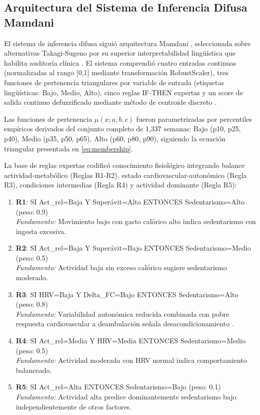 \subsection{Arquitectura del Sistema de Inferencia Difusa Mamdani}
\label{subsec:sistema_difuso}

El sistema de inferencia difusa siguió arquitectura Mamdani \cite{Mamdani1974}, seleccionada sobre alternativas Takagi-Sugeno por su superior interpretabilidad lingüística que habilita auditoría clínica \cite{Czmil2023FuzzyClassifiers}. El sistema comprendió cuatro entradas continuas (normalizadas al rango [0,1] mediante transformación RobustScaler), tres funciones de pertenencia triangulares por variable de entrada (etiquetas lingüísticas: Bajo, Medio, Alto), cinco reglas IF-THEN expertas y un score de salida continuo defuzzificado mediante método de centroide discreto \cite{Ross2010}.

Las funciones de pertenencia $\mu(x; a, b, c)$ fueron parametrizadas por percentiles empíricos derivados del conjunto completo de 1,337 semanas: Bajo (p10, p25, p40), Medio (p35, p50, p65), Alto (p60, p80, p90), siguiendo la ecuación triangular presentada en \eqref{eq:membership}.

La base de reglas expertas codificó conocimiento fisiológico integrando balance actividad-metabólico (Reglas R1-R2), estado cardiovascular-autonómico (Regla R3), condiciones intermedias (Regla R4) y actividad dominante (Regla R5):

\begin{enumerate}
\item \textbf{R1}: SI Act\_rel=Baja Y Superávit=Alto ENTONCES Sedentarismo=Alto (peso: 0.9) \\ \textit{Fundamento:} Movimiento bajo con gasto calórico alto indica sedentarismo con ingesta excesiva.

\item \textbf{R2}: SI Act\_rel=Baja Y Superávit=Bajo ENTONCES Sedentarismo=Medio (peso: 0.5) \\ \textit{Fundamento:} Actividad baja sin exceso calórico sugiere sedentarismo moderado.

\item \textbf{R3}: SI HRV=Baja Y Delta\_FC=Bajo ENTONCES Sedentarismo=Alto (peso: 0.8) \\ \textit{Fundamento:} Variabilidad autonómica reducida combinada con pobre respuesta cardiovascular a deambulación señala desacondicionamiento \cite{Thayer2009,Shaffer2017}.

\item \textbf{R4}: SI Act\_rel=Media Y HRV=Media ENTONCES Sedentarismo=Medio (peso: 0.5) \\ \textit{Fundamento:} Actividad moderada con HRV normal indica comportamiento balanceado.

\item \textbf{R5}: SI Act\_rel=Alta ENTONCES Sedentarismo=Bajo (peso: 0.1) \\ \textit{Fundamento:} Actividad alta predice dominantemente sedentarismo bajo independientemente de otros factores.
\end{enumerate}

